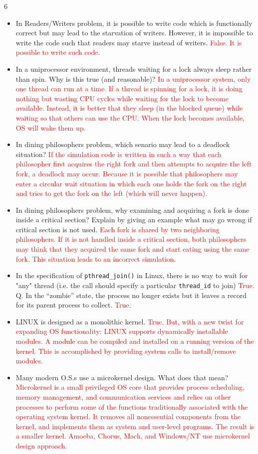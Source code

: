 \documentclass[9pt,landscape]{memoir}
\newcommand{\answer}[1]{\textcolor{red}{#1}}
\begin{document}
\begin{multicols}{6}
\begin{itemize}
    \item In Readers/Writers problem, it is possible to write code which is functionally correct but may lead to the starvation of writers. However, it is impossible to write the code such that readers may starve instead of writers. \answer{False. It is possible to write such code.}
    \item In a uniprocessor environment, threads waiting for a lock always sleep rather than spin. Why is this true (and reasonable)? \answer{In a uniprocessor system, only one thread can run at a time. If a thread is spinning for a lock, it is doing nothing but wasting CPU cycles while waiting for the lock to become available. Instead, it is better that they sleep (in the blocked queue) while waiting so that others can use the CPU.  When the lock becomes available, OS will wake them up.}
    \item In dining philosophers problem, which senario may lead to a deadlock situation?  \answer{If the simulation code is written in such a way that each philosopher first acquires the right fork and then attempts to acquire the left fork, a deadlock may occur. Because it is possible that philosophers may enter a circular wait situation in which each one holds the fork on the right and tries to get the fork on the left (which will never happen).}
    \item In dining philosophers problem, why examining and acquiring a fork is done inside a critical section? Explain by giving an example what may go wrong if critical section is not used.  \answer{Each fork is shared by two neighboring philosophers. If it is not handled inside a critical section, both philosophers may think that they acquired the same fork and start eating using the same fork. This situation leads to an incorrect simulation.}
    \item In the specification of \verb$pthread_join()$ in Linux, there is no way to wait for "any" thread (i.e. the call should specify a particular \verb$thread_id$ to join) \answer{True.}
    Q. In the ``zombie'' state, the process no longer exists but it leaves a record for its parent process to collect. \answer{True.}
    \item LINUX is designed as a monolithic kernel. \answer{True. But, with a new twist for expanding OS functionality: LINUX supports dynamically installable modules. A module can be compiled and installed on a running version of the kernel. This is accomplished by providing system calls to install/remove modules.}
    \item Many modern O.S.s use a microkernel design.  What does that mean? \answer{Microkernel is a small privileged OS core that provides process scheduling, memory management, and communication services and relies on other processes to perform some of the functions traditionally associated with the operating system kernel. It removes all nonessential components from the kernel, and implements them as system and user-level programs. The result is a smaller kernel. Amoeba, Chorus, Mach, and Windows/NT use microkernel design approach.}

\end{itemize}
\end{multicols}
\end{document}

